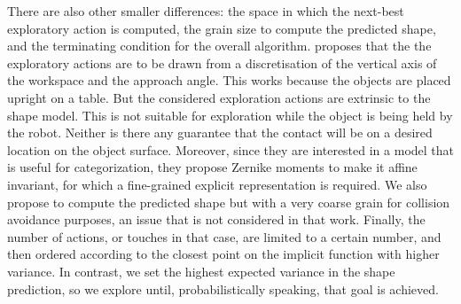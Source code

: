 There are also other smaller differences: the space in which the next-best exploratory action is computed, the grain size to compute the predicted shape, and the terminating condition for the overall algorithm.
\citet{Bjorkman2013Enhancing}
proposes that the the exploratory actions are to be drawn from a discretisation of the vertical axis of the workspace and the approach angle. This works because the objects are placed upright on a table. But the considered exploration actions are extrinsic to the shape model. This is not suitable for exploration while the object is being held by the robot. Neither is there any guarantee that the contact will be on a desired location on the object surface. Moreover, since they are interested in a model that is useful for categorization, they propose Zernike moments to make it affine invariant, for which a fine-grained explicit representation is required. We also propose to compute the predicted shape but with a very coarse grain for collision avoidance purposes, an issue that is not considered in that work. Finally, the number of actions, or touches in that case, are limited to a certain number, and then ordered according to the closest point on the implicit function with higher variance. In contrast, we set the highest expected variance in the shape prediction, so we explore until, probabilistically speaking, that goal is achieved.
